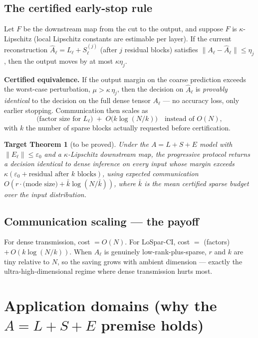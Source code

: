 \documentclass[11pt]{article}
\newtheorem{claim}{Target Theorem}
\newcommand{\norm}[1]{\lVert #1 \rVert}
\begin{document}
\subsection{The certified early-stop rule}
\label{sec:cert}
Let $F$ be the downstream map from the cut to the output, and suppose $F$ is $\kappa$-Lipschitz
(local Lipschitz constants are estimable per layer). If the current reconstruction
$\hat A_\ell = L_\ell + S_\ell^{(j)}$ (after $j$ residual blocks) satisfies
$\norm{A_\ell-\hat A_\ell}\le \eta_j$, then the output moves by at most $\kappa\eta_j$.

\begin{theorybox}
\textbf{Certified equivalence.} If the output margin on the coarse prediction exceeds the
worst-case perturbation, $\mu > \kappa\,\eta_j$, then the decision on $\hat A_\ell$ is
\emph{provably identical} to the decision on the full dense tensor $A_\ell$ --- no accuracy
loss, only earlier stopping. Communication then scales as
\[
\text{(factor size for } L_\ell) \;+\; O\!\big(k\log(N/k)\big) \quad\text{instead of } O(N),
\]
with $k$ the number of sparse blocks actually requested before certification.
\end{theorybox}

\begin{claim}[to be proved]
Under the $A=L+S+E$ model with $\norm{E_\ell}\le\varepsilon_0$ and a $\kappa$-Lipschitz
downstream map, the progressive protocol returns a decision identical to dense inference on
every input whose margin exceeds $\kappa(\varepsilon_0+\text{residual after } k \text{ blocks})$,
using expected communication $O(r\!\cdot\!\text{(mode size)} + \bar k\log(N/\bar k))$, where
$\bar k$ is the mean certified sparse budget over the input distribution.
\end{claim}

\subsection{Communication scaling --- the payoff}
For dense transmission, cost $=O(N)$. For LoSpar-CI, cost $=$ (factors) $+\,O(k\log(N/k))$.
When $A_\ell$ is genuinely low-rank-plus-sparse, $r$ and $k$ are tiny relative to $N$, so the
saving grows with ambient dimension --- exactly the ultra-high-dimensional regime where dense
transmission hurts most.

\section{Application domains (why the \texorpdfstring{$A=L+S+E$}{A=L+S+E} premise holds)}
\end{document}

